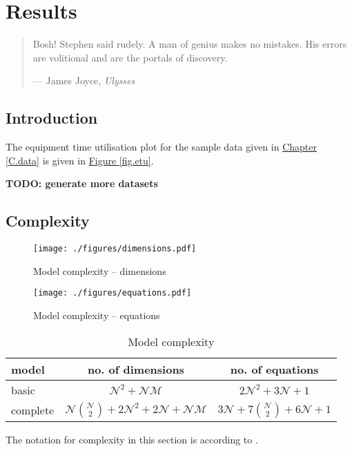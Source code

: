 %
%
%
%

\chapter{Results}\label{C.results}

\begin{quote}
Bosh! Stephen said rudely.
A man of genius makes no mistakes.
His errors are volitional and are the portals of discovery.

\hspace{2cm}--- James Joyce, \emph{Ulysses}
\end{quote}

\section{Introduction}\label{S.intro5}

The equipment time utilisation plot for the sample data given in 
\hyperref[C.data]{Chapter \ref*{C.data}} is given in
\hyperref[fig.etu]{Figure \ref*{fig.etu}}.

\textbf{TODO: generate more datasets}

\section{Complexity}\label{S.complexity}
\begin{figure}
    \centering
    \texttt{[image: ./figures/dimensions.pdf]}
    \caption{Model complexity -- dimensions}
    \label{fig.dims}
\end{figure}
\begin{figure}
    \centering
    \texttt{[image: ./figures/equations.pdf]}
    \caption{Model complexity -- equations}
    \label{fig.eqns}
\end{figure}
\begin{table}[h!]
    \centering
    \caption{Model complexity}
    \label{tbl.complexity1}
    \begin{tabular}{l | c | c}
        model & no. of dimensions & no. of equations\\ \hline
        basic & $\mathcal{N}^2 + \mathcal{N} \mathcal{M}$
            & $2\mathcal{N}^2 + 3\mathcal{N} + 1$\\
        complete & $\mathcal{N} {{\mathcal{N}}\choose{2}}
            + 2\mathcal{N}^2 + 2\mathcal{N} +\mathcal{N} \mathcal{M}$
            & $3\mathcal{N} + 7{{\mathcal{N}}\choose{2}} + 6\mathcal{N} + 1$\\
    \end{tabular}
\end{table}
The notation for complexity in this section is according to \citet{Knuth:1976}.


